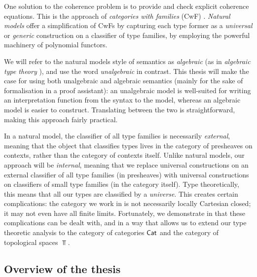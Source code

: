 One solution to the coherence problem is to
provide and check explicit coherence equations.
This is the approach of \emph{categories with families} (CwF) \cite{clairambault2011}.
\emph{Natural models} \cite{awodey2018}
offer a simplification of CwFs
by capturing each type former as a \emph{universal} or \emph{generic}
construction on a classifier of type families,
by employing the powerful machinery of polynomial functors.

We will refer to the natural models style of semantics as \emph{algebraic}
(as in \emph{algebraic type theory} \cite{awodey2025}),
and use the word \emph{unalgebraic} in contrast.
This thesis will make the case for using both unalgebraic and algebraic semantics
(mainly for the sake of formalisation in a proof assistant):
an unalgebraic model is well-suited for writing an interpretation function
from the syntax to the model,
whereas an algebraic model is easier to construct.
Translating between the two is straightforward,
making this approach fairly practical.

In a natural model,
the classifier of all type families is necessarily \emph{external},
meaning that the object that classifies types lives in the category of presheaves
on contexts, rather than the category of contexts itself.
Unlike natural models, our approach will be \emph{internal},
meaning that we replace universal constructions on an external classifier
of all type families (in presheaves) with universal constructions
on classifiers of small type families (in the category itself).
Type theoretically,
this means that all our types are classified by a \emph{universe}.
This creates certain complications:
the category we work in is not necessarily locally Cartesian closed;
it may not even have all finite limits.
Fortunately, we demonstrate in 
that these complications can be dealt with,
and in a way that allows us to extend our type theoretic analysis
to the category of categories $\mathsf{Cat}$ and the category of topological spaces $\Top$.


\subsection*{Overview of the thesis}

